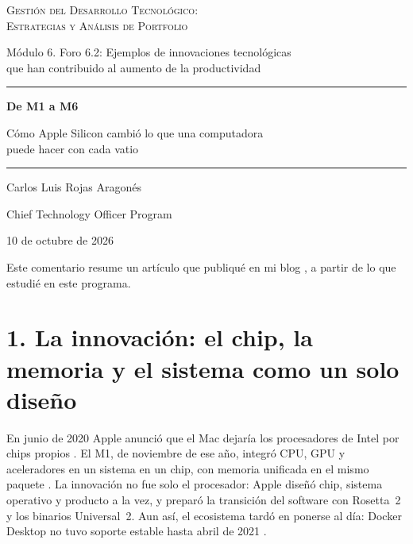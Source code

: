 \documentclass[11pt,letterpaper]{article}
\begin{document}
\begin{titlepage}
\centering
\vspace*{3.2cm}
{\large\scshape Gestión del Desarrollo Tecnológico:\\
Estrategias y Análisis de Portfolio\par}
\vspace{0.5cm}
{\normalsize Módulo 6. Foro 6.2: Ejemplos de innovaciones tecnológicas\\
que han contribuido al aumento de la productividad\par}
\vspace{2.6cm}
{\color{cEje}\rule{0.55\textwidth}{0.8pt}\par}
\vspace{0.7cm}
{\LARGE\bfseries De M1 a M6\par}
\vspace{0.5cm}
{\large Cómo Apple Silicon cambió lo que una computadora\\
puede hacer con cada vatio\par}
\vspace{0.7cm}
{\color{cEje}\rule{0.55\textwidth}{0.8pt}\par}
\vfill
{\large Carlos Luis Rojas Aragonés\par}
\vspace{0.3cm}
{\normalsize Chief Technology Officer Program\par}
\vspace{0.3cm}
{\normalsize 10 de octubre de 2026\par}
\vspace*{1.5cm}
\end{titlepage}

Este comentario resume un artículo que publiqué en mi blog
\parencite{rojas2026}, a partir de lo que estudié en este programa.

\section*{1. La innovación: el chip, la memoria y el sistema como un solo diseño}

En junio de 2020 Apple anunció que el Mac dejaría los procesadores de Intel
por chips propios \parencite{apple2020transicion}. El M1, de noviembre de ese
año, integró CPU, GPU y aceleradores en un sistema en un chip, con memoria
unificada en el mismo paquete \parencite{apple2020m1}. La innovación no fue
solo el procesador: Apple diseñó chip, sistema operativo y producto a la vez,
y preparó la transición del software con Rosetta~2 y los binarios Universal~2.
Aun así, el ecosistema tardó en ponerse al día: Docker Desktop no tuvo
soporte estable hasta abril de 2021 \parencite{docker2021}.
\end{document}
